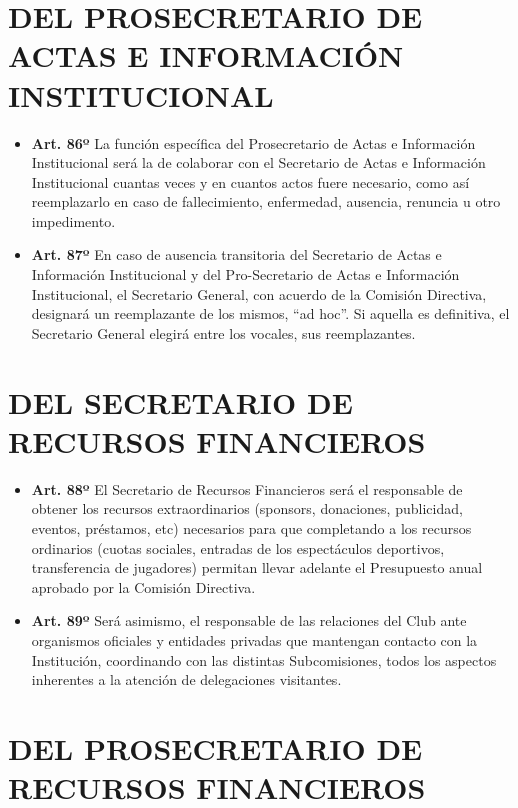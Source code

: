 \documentclass[]{book}
\begin{document}
\chapter{DEL PROSECRETARIO DE ACTAS E INFORMACIÓN
INSTITUCIONAL}\label{del-prosecretario-de-actas-e-informacion-institucional}

\begin{itemize}
\item
  \textbf{Art. 86º} La función específica del Prosecretario de Actas e
  Información Institucional será la de colaborar con el Secretario de
  Actas e Información Institucional cuantas veces y en cuantos actos
  fuere necesario, como así reemplazarlo en caso de fallecimiento,
  enfermedad, ausencia, renuncia u otro impedimento.
\item
  \textbf{Art. 87º} En caso de ausencia transitoria del Secretario de
  Actas e Información Institucional y del Pro-Secretario de Actas e
  Información Institucional, el Secretario General, con acuerdo de la
  Comisión Directiva, designará un reemplazante de los mismos, ``ad
  hoc''. Si aquella es definitiva, el Secretario General elegirá entre
  los vocales, sus reemplazantes.
\end{itemize}

\chapter{DEL SECRETARIO DE RECURSOS
FINANCIEROS}\label{del-secretario-de-recursos-financieros}

\begin{itemize}
\item
  \textbf{Art. 88º} El Secretario de Recursos Financieros será el
  responsable de obtener los recursos extraordinarios (sponsors,
  donaciones, publicidad, eventos, préstamos, etc) necesarios para que
  completando a los recursos ordinarios (cuotas sociales, entradas de
  los espectáculos deportivos, transferencia de jugadores) permitan
  llevar adelante el Presupuesto anual aprobado por la Comisión
  Directiva.
\item
  \textbf{Art. 89º} Será asimismo, el responsable de las relaciones del
  Club ante organismos oficiales y entidades privadas que mantengan
  contacto con la Institución, coordinando con las distintas
  Subcomisiones, todos los aspectos inherentes a la atención de
  delegaciones visitantes.
\end{itemize}

\chapter{DEL PROSECRETARIO DE RECURSOS
FINANCIEROS}\label{del-prosecretario-de-recursos-financieros}
\end{document}
